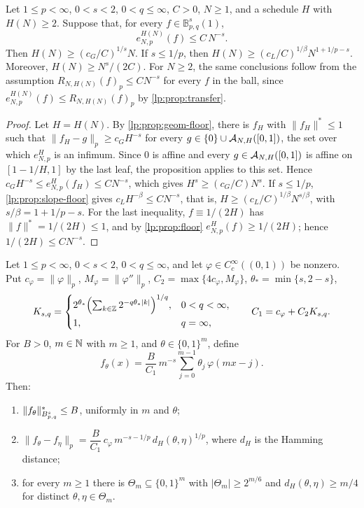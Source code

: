 \documentclass[11pt,a4paper]{article}
\begin{document}
\begin{corolario}
\label{lp:cor:joint-necessity}
Let $1\le p<\infty$, $0<s<2$, $0<q\le\infty$, $C>0$, $N\ge1$, and a schedule $H$ with $H(N)\ge2$. Suppose that, for every $f\in\mathbb B^s_{p,q}(1)$,
\[
 e^{H(N)}_{N,p}(f)\le C\,N^{-s}.
\]
Then $H(N)\ge(c_G/C)^{1/s}N$. If $s\le1/p$, then $H(N)\ge(c_L/C)^{1/\beta}N^{1+1/p-s}$. Moreover, $H(N)\ge N^s/(2C)$. For $N\ge2$, the same conclusions follow from the assumption $R_{N,H(N)}(f)_p\le CN^{-s}$ for every $f$ in the ball, since $e^{H(N)}_{N,p}(f)\le R_{N,H(N)}(f)_p$ by \cref{lp:prop:transfer}.
\end{corolario}

\begin{proof}
Let $H=H(N)$. By \cref{lp:prop:geom-floor}, there is $f_H$ with $\|f_H\|^*\le1$ such that $\|f_H-g\|_p\ge c_GH^{-s}$ for every $g\in\{0\}\cup\mathcal A_{N,H}([0,1])$, the set over which $e^H_{N,p}$ is an infimum. Since $0$ is affine and every $g\in\mathcal A_{N,H}([0,1])$ is affine on $[1-1/H,1]$ by the last leaf, the proposition applies to this set. Hence $c_GH^{-s}\le e^H_{N,p}(f_H)\le CN^{-s}$, which gives $H^s\ge(c_G/C)N^s$. If $s\le1/p$, \cref{lp:prop:slope-floor} gives $c_LH^{-\beta}\le CN^{-s}$, that is, $H\ge(c_L/C)^{1/\beta}N^{s/\beta}$, with $s/\beta=1+1/p-s$. For the last inequality, $f\equiv1/(2H)$ has $\|f\|^*=1/(2H)\le1$, and by \cref{lp:prop:floor} $e^H_{N,p}(f)\ge1/(2H)$; hence $1/(2H)\le CN^{-s}$.
\end{proof}

\begin{lema}
\label{lp:lem:packing}
Let $1\le p<\infty$, $0<s<2$, $0<q\le\infty$, and let $\varphi\in C_c^\infty((0,1))$ be nonzero. Put $c_\varphi=\|\varphi\|_p$, $M_\varphi=\|\varphi''\|_p$, $C_2=\max\{4c_\varphi,M_\varphi\}$, $\theta_*=\min\{s,2-s\}$,
\[
K_{s,q}=\begin{cases}2^{\theta_*}\Bigl(\sum_{k\in\mathbb Z}2^{-q\theta_*|k|}\Bigr)^{1/q}, & 0<q<\infty,\\[4pt] 1, & q=\infty,\end{cases}
\qquad
C_1=c_\varphi+C_2K_{s,q}.
\]
For $B>0$, $m\in\mathbb N$ with $m\ge1$, and $\theta\in\{0,1\}^m$, define
\[
f_\theta(x)=\frac{B}{C_1}\,m^{-s}\sum_{j=0}^{m-1}\theta_j\,\varphi(mx-j).
\]
Then:
\begin{enumerate}[label=(\roman*)]
\item $\|f_\theta\|^*_{B^{s}_{p,q}}\le B$, uniformly in $m$ and $\theta$;
\item $\|f_\theta-f_\eta\|_p=\dfrac{B}{C_1}\,c_\varphi\,m^{-s-1/p}\,d_H(\theta,\eta)^{1/p}$, where $d_H$ is the Hamming distance;
\item for every $m\ge1$ there is $\Theta_m\subseteq\{0,1\}^m$ with $|\Theta_m|\ge 2^{m/6}$ and $d_H(\theta,\eta)\ge m/4$ for distinct $\theta,\eta\in\Theta_m$.
\end{enumerate}
\end{lema}
\end{document}
